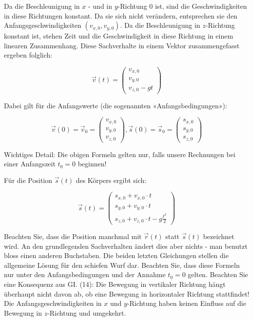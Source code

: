 Da die Beschleunigung in $x$ - und in $y$-Richtung 0 ist, sind die Geschwindigkeiten in diese Richtungen konstant. Da sie sich nicht verändern, entsprechen sie den Anfangsgeschwindigkeiten $\left(v_{x, 0}, v_{y, 0}\right)$. Da die Beschleunigung in $z$-Richtung konstant ist, stehen Zeit und die Geschwindigkeit in diese Richtung in einem linearen Zusammenhang. Diese Sachverhalte in einem Vektor zusammengefasst ergeben folglich:

$$
\vec{v}(t)=\left(\begin{array}{c}
v_{x, 0} \\
v_{y, 0} \\
v_{z, 0}-g t
\end{array}\right)
$$

Dabei gilt für die Anfangswerte (die sogenannten «Anfangsbedingungen»):

$$
\vec{v}(0)=\vec{v}_{0}=\left(\begin{array}{l}
v_{x, 0} \\
v_{y, 0} \\
v_{z, 0}
\end{array}\right), \vec{s}(0)=\vec{s}_{0}=\left(\begin{array}{l}
s_{x, 0} \\
s_{y, 0} \\
s_{z, 0}
\end{array}\right)
$$

Wichtiges Detail: Die obigen Formeln gelten nur, falls unsere Rechnungen bei einer Anfangszeit $t_{0}=0$ beginnen!

Für die Position $\vec{s}(t)$ des Körpers ergibt sich:

$$
\vec{s}(t)=\left(\begin{array}{c}
s_{x, 0}+v_{x, 0} \cdot t \\
s_{y, 0}+v_{y, 0} \cdot t \\
s_{z, 0}+v_{z, 0} \cdot t-g \frac{t^{2}}{2}
\end{array}\right)
$$

Beachten Sie, dass die Position manchmal mit $\vec{r}(t)$ statt $\vec{s}(t)$ bezeichnet wird. An den grundlegenden Sachverhalten ändert dies aber nichts - man benutzt bloss einen anderen Buchstaben. Die beiden letzten Gleichungen stellen die allgemeine Lösung für den schiefen Wurf dar. Beachten Sie, dass diese Formeln nur unter den Anfangsbedingungen und der Annahme $t_{0}=0$ gelten. Beachten Sie eine Konsequenz aus GI. (14): Die Bewegung in vertikaler Richtung hängt überhaupt nicht davon ab, ob eine Bewegung in horizontaler Richtung stattfindet! Die Anfangsgeschwindigkeiten in $x$ und $y$-Richtung haben keinen Einfluss auf die Bewegung in $z$-Richtung und umgekehrt.

